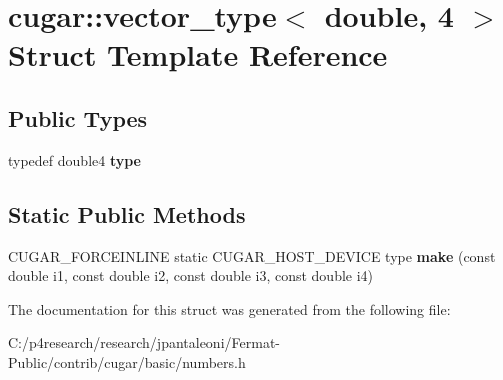 \hypertarget{structcugar_1_1vector__type_3_01double_00_014_01_4}{}\section{cugar\+:\+:vector\+\_\+type$<$ double, 4 $>$ Struct Template Reference}
\label{structcugar_1_1vector__type_3_01double_00_014_01_4}
\subsection*{Public Types}
\begin{DoxyCompactItemize}
\item 
\mbox{\label{structcugar_1_1vector__type_3_01double_00_014_01_4_a2e839a8c7bb8109dffc866cc4b2cb6e3}} 
typedef double4 {\bfseries type}
\end{DoxyCompactItemize}
\subsection*{Static Public Methods}
\begin{DoxyCompactItemize}
\item 
\mbox{\label{structcugar_1_1vector__type_3_01double_00_014_01_4_a0748a369df4db0b8be94166cd93db816}} 
C\+U\+G\+A\+R\+\_\+\+F\+O\+R\+C\+E\+I\+N\+L\+I\+NE static C\+U\+G\+A\+R\+\_\+\+H\+O\+S\+T\+\_\+\+D\+E\+V\+I\+CE type {\bfseries make} (const double i1, const double i2, const double i3, const double i4)
\end{DoxyCompactItemize}


The documentation for this struct was generated from the following file\+:\begin{DoxyCompactItemize}
\item 
C\+:/p4research/research/jpantaleoni/\+Fermat-\/\+Public/contrib/cugar/basic/numbers.\+h\end{DoxyCompactItemize}

